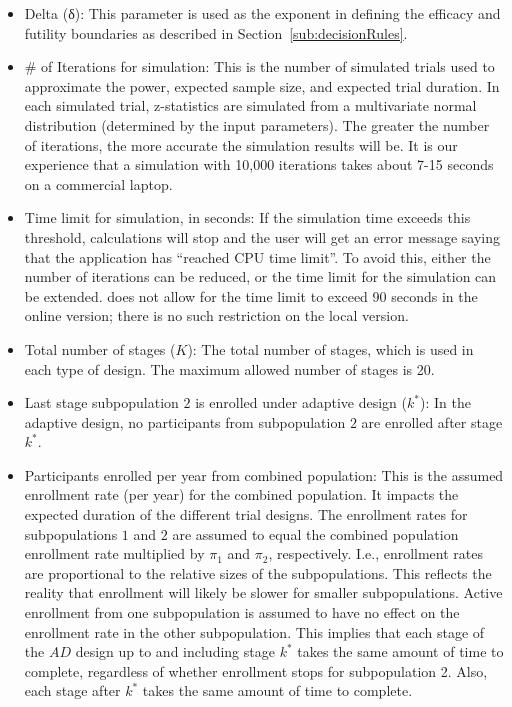 \documentclass[article]{jss}
\begin{document}
\begin{itemize}

\item Delta (δ): This parameter is used as the exponent in defining the efficacy and futility boundaries as described in Section~\ref{sub:decisionRules}. %

\item \# of Iterations for simulation: This is the number of simulated trials used to 
 approximate the power, expected sample size, and expected trial duration. In each simulated trial,
 z-statistics are simulated from a multivariate normal distribution (determined by the input parameters).
The greater the number of iterations, the more accurate the simulation results will be.
It is our experience that a simulation with 10,000 iterations takes about 7-15 seconds on a commercial laptop.

\item Time limit for simulation, in seconds: If the simulation time exceeds this threshold, calculations will stop and the user will get an error message saying that the application has ``reached CPU time limit''. To avoid this, either the number of iterations can be reduced, or the time limit for the simulation can be extended.  does not allow for the time limit to exceed 90 seconds in the online version; there is no such restriction on the local version.

\item Total number of stages ($K$): The total number of stages, which is used in each type of design. The maximum allowed number of stages is 20.

\item Last stage subpopulation $2$ is enrolled under adaptive design ($k^*$): In the adaptive design, no participants from subpopulation $2$ are enrolled after stage $k^*$. 

\item Participants enrolled per year from combined population: This is the assumed enrollment rate (per year) for the combined population. It impacts the expected duration of the different trial designs. The enrollment rates for  subpopulations $1$ and $2$ are assumed to equal the combined population enrollment rate multiplied by $π_1$ and $π_2$, respectively. I.e., enrollment rates are proportional to the relative sizes of the subpopulations. This reflects the reality that enrollment will likely be slower for smaller subpopulations.
Active enrollment from one subpopulation is assumed to have no effect on the enrollment rate in the other subpopulation. This implies that each stage of the $AD$ design up to and including stage $k^*$ takes the same amount of time to complete, regardless of whether enrollment stops for subpopulation 2. Also, each stage after $k^*$ takes the same amount of time to complete. 


\end{itemize}
\end{document}
